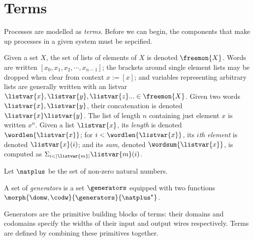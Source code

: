 \section{Terms}

Processes are modelled as \emph{terms}.
Before we can begin, the components that make up processes in a given system
must be sepcified.

\begin{notation}
    Given a set \(X\), the set of lists of elements of \(X\) is denoted
    \(\freemon{X}\).
    Words are written \([x_0, x_1, x_2, \cdots, x_{n-1}]\); the brackets around
    single element lists may be dropped when clear from context \(x := [x]\);
    and variables representing arbitrary lists are generally written with an
    listvar \(
        \listvar{x}, \listvar{y}, \listvar{z}... \in \freemon{X}
    \).
    Given two words \(\listvar{x}, \listvar{y}\), their concatenation is
    denoted \(\listvar{x}\listvar{y}\).
    The list of length \(n\) containing just element \(x\) is written \(x^n\).
    Given a list \(\listvar{x}\), its \emph{length} is denoted
    \(\wordlen{\listvar{x}}\); for \(i < \wordlen{\listvar{x}}\), its
    \(i\)\emph{th element} is denoted \(\listvar{x}(i)\); and its
    \emph{sum}, denoted \(\wordsum{\listvar{x}}\), is computed as
    \(\Sigma_{i < |\listvar{m}|}\listvar{m}(i)\).
\end{notation}

\begin{notation}
    Let \(\natplus\) be the set of non-zero natural numbers.
\end{notation}

\begin{definition}[Generators]
    A set of \emph{generators} is a set \(\generators\) equipped with two
    functions \(\morph{\domw,\codw}{\generators}{\natplus^\star}\).
\end{definition}

Generators are the primitive building blocks of terms: their domains and
codomains specify the widths of their input and output wires respectively.
Terms are defined by combining these primitives together.

